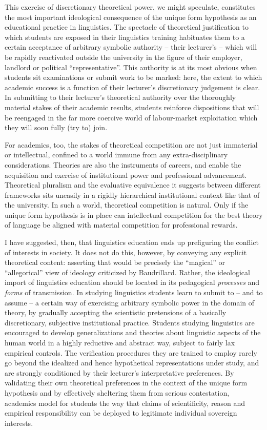 \documentclass[output=paper]{langscibook}
\begin{document}
This exercise of discretionary theoretical power, we might speculate, constitutes the most important ideological consequence of the unique form hypothesis as an educational practice in linguistics. The spectacle of theoretical justification to which students are exposed in their linguistics training habituates them to a certain acceptance of arbitrary symbolic authority – their lecturer's – which will be rapidly reactivated outside the university in the figure of their employer, landlord or political ``representative''. This authority is at its most obvious when students sit examinations or submit work to be marked: here, the extent to which academic success is a function of their lecturer's discretionary judgement is clear. In submitting to their lecturer's theoretical authority over the thoroughly material stakes of their academic results, students reinforce dispositions that will be reengaged in the far more coercive world of labour-market exploitation which they will soon fully (try to) join.

For academics, too, the stakes of theoretical competition are not just immaterial or intellectual, confined to a world immune from any extra-disciplinary considerations. Theories are also the instruments of careers, and enable the acquisition and exercise of institutional power and professional advancement. Theoretical pluralism and the evaluative equivalence it suggests between different frameworks sits uneasily in a rigidly hierarchical institutional context like that of the university. In such a world, theoretical competition is natural. Only if the unique form hypothesis is in place can intellectual competition for the best theory of language be aligned with material competition for professional rewards.

I have suggested, then, that linguistics education ends up prefiguring the conflict of interests in society. It does not do this, however, by conveying any explicit theoretical content: asserting that would be precisely the ``magical'' or ``allegorical'' view of ideology criticized by Baudrillard. Rather, the ideological import of linguistics education should be located in its pedagogical \emph{processes} and \emph{forms} of transmission. In studying linguistics students learn to submit to – and to assume – a certain way of exercising arbitrary symbolic power in the domain of theory, by gradually accepting the scientistic pretensions of a basically discretionary, subjective institutional practice. Students studying linguistics are encouraged to develop generalizations and theories about linguistic aspects of the human world in a highly reductive and abstract way, subject to fairly lax empirical controls. The verification procedures they are trained to employ rarely go beyond the idealized and hence hypothetical representations under study, and are strongly conditioned by their lecturer's interpretative preferences. By validating their own theoretical preferences in the context of the unique form hypothesis and by effectively sheltering them from serious contestation, academics model for students the way that claims of scientificity, reason and empirical responsibility can be deployed to legitimate individual sovereign interests.
\end{document}
